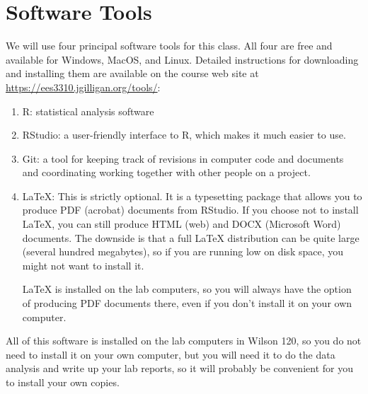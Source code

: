 \documentclass[
]{article}
\begin{document}
\hypertarget{software-tools}{%
\section{Software Tools}\label{software-tools}}

We will use four principal software tools for this class. All four are
free and available for Windows, MacOS, and Linux. Detailed instructions
for downloading and installing them are available on the course web site
at \url{https://ees3310.jgilligan.org/tools/}:

\begin{enumerate}
\def\labelenumi{\arabic{enumi}.}
\item
  R: statistical analysis software
\item
  RStudio: a user-friendly interface to R, which makes it much easier to
  use.
\item
  Git: a tool for keeping track of revisions in computer code and
  documents and coordinating working together with other people on a
  project.
\item
  LaTeX: This is strictly optional. It is a typesetting package that
  allows you to produce PDF (acrobat) documents from RStudio. If you
  choose not to install LaTeX, you can still produce HTML (web) and DOCX
  (Microsoft Word) documents. The downside is that a full LaTeX
  distribution can be quite large (several hundred megabytes), so if you
  are running low on disk space, you might not want to install it.

  LaTeX is installed on the lab computers, so you will always have the
  option of producing PDF documents there, even if you don't install it
  on your own computer.
\end{enumerate}

All of this software is installed on the lab computers in Wilson 120, so
you do not need to install it on your own computer, but you will need it
to do the data analysis and write up your lab reports, so it will
probably be convenient for you to install your own copies.
\end{document}
